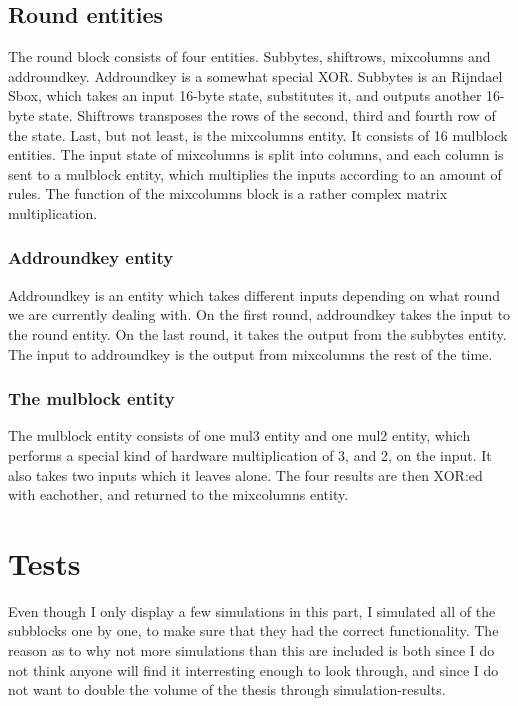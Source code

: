 \subsection{Round entities}
The round block consists of four entities. Subbytes, shiftrows, mixcolumns and 
addroundkey. Addroundkey is a somewhat special XOR. Subbytes is an Rijndael 
Sbox, which takes an input 16-byte state, substitutes it, and outputs another 
16-byte state. Shiftrows transposes the rows of the second, third and fourth 
row of the state. Last, but not least, is the mixcolumns entity. It consists of 
16 mulblock entities. The input state of mixcolumns is split into columns, and 
each column is sent to a mulblock entity, which multiplies the inputs according 
to an amount of rules. The function of the mixcolumns block is a rather complex 
matrix multiplication.

\subsubsection{Addroundkey entity}
Addroundkey is an entity which takes different inputs depending on 
what round we are currently dealing with. On the first round, addroundkey takes 
the input to the round entity. On the last round, it takes the output from the 
subbytes entity. The input to addroundkey is the output from mixcolumns the rest 
of the time.

\subsubsection{The mulblock entity}
The mulblock entity consists of one mul3 entity and one mul2 entity, which 
performs a special kind of hardware multiplication of 3, and 2, on the input. It 
also takes two inputs which it leaves alone. The four results are then XOR:ed 
with eachother, and returned to the mixcolumns entity.

\section{Tests}
Even though I only display a few simulations in this part, I simulated all of 
the subblocks one by one, to make sure that they had the correct functionality. 
The reason as to why not more simulations than this are included is both since 
I do not think anyone will find it interresting enough to look through, and since
I do not want to double the volume of the thesis through simulation-results.

